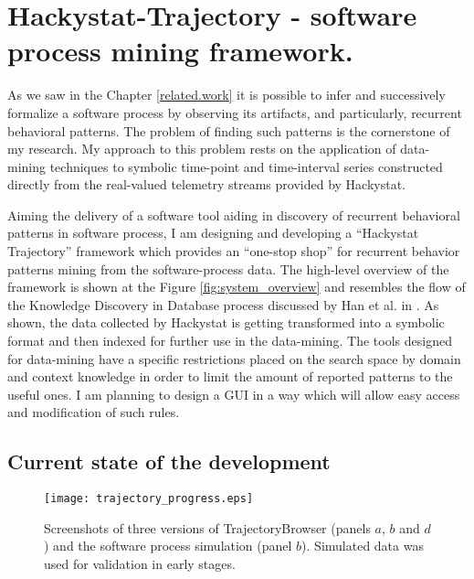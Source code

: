 \chapter{Hackystat-Trajectory - software process mining framework.} \label{trajectory}
As we saw in the Chapter \ref{related.work} it is possible to infer and successively formalize a software process by observing its artifacts, and particularly, recurrent behavioral patterns. The problem of finding such patterns is the cornerstone of my research. My approach to this problem rests on the application of data-mining techniques to symbolic time-point and time-interval series constructed directly from the real-valued telemetry streams provided by Hackystat.

Aiming the delivery of a software tool aiding in discovery of recurrent behavioral patterns in software process, I am designing and developing a ``Hackystat Trajectory'' framework which provides an ``one-stop shop'' for recurrent behavior patterns mining from the software-process data. The high-level overview of the framework is shown at the Figure \ref{fig:system_overview} and resembles the flow of the Knowledge Discovery in Database process discussed by Han et al. in \cite{citeulike:709476}. As shown, the data collected by Hackystat is getting transformed into a symbolic format and then indexed for further use in the data-mining. The tools designed for data-mining have a specific restrictions placed on the search space by domain and context knowledge in order to limit the amount of reported patterns to the useful ones. I am planning to design a GUI in a way which will allow easy access and modification of such rules. 

\section{Current state of the development}

\begin{figure}[tbp]
   \centering
   \texttt{[image: trajectory\_progress.eps]}
   \caption{Screenshots of three versions of TrajectoryBrowser (panels $a$, $b$ and $d$) and the software process simulation (panel $b$). Simulated data was used for validation in early stages.}
   \label{fig:trajectory_progress}
\end{figure}

